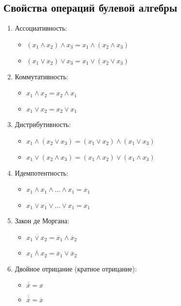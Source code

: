 \documentclass[10pt]{article}
\begin{document}
\subsection*{Свойства операций булевой алгебры}
\begin{enumerate}
    \item Ассоциативность:
        \begin{itemize}
            \item $(x_1 \land x_2) \land x_3 = x_1 \land (x_2 \land x_3)$
            \item $(x_1 \lor x_2) \lor x_3 = x_1 \lor (x_2 \lor x_3)$
        \end{itemize}
    \item Коммутативность:
        \begin{itemize}
            \item $x_1 \land x_2 = x_2 \land x_1$
            \item $x_1 \lor x_2 = x_2 \lor x_1$
        \end{itemize}
    \item Дистрибутивность:
        \begin{itemize}
            \item $x_1 \land (x_2 \lor x_3) = (x_1 \lor x_2) \land (x_1 \lor x_3)$
            \item $x_1 \lor (x_2 \land x_3) = (x_1 \land x_2) \lor (x_1 \land x_3)$
        \end{itemize}
    \item Идемпотентность:
        \begin{itemize}
            \item $x_1 \land x_1 \land \dots \land x_1 = x_1$
            \item $x_1 \lor x_1 \lor \dots \lor x_1 = x_1$
        \end{itemize}
    \item Закон де Моргана:
        \begin{itemize}
            \item $\overline{x_1 \lor x_2} = \overline x_1 \land \overline x_2$
            \item $\overline{x_1 \land x_2} = \overline x_1 \lor \overline x_2$
        \end{itemize}
    \item Двойное отрицание (кратное отрицание):
        \begin{itemize}
            \item $\overline{\overline x} = x$
            \item $\overline {\overline {\overline x}} = {\overline x}$

\end{itemize}
\end{enumerate}
\end{document}
